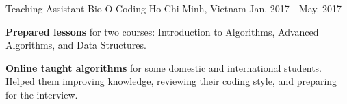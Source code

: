 \begin{cventries}
  \cventry
    {Teaching Assistant} %
    {Bio-O Coding} %
    {Ho Chi Minh, Vietnam} %
    {Jan. 2017 - May. 2017} %
    {
      \begin{cvitems} %
        \item {\textbf{Prepared lessons} for two courses: Introduction to Algorithms, Advanced Algorithms, and Data Structures.}
        \item {\textbf{Online taught algorithms} for some domestic and international students. Helped them improving knowledge, reviewing their coding style, and preparing for the interview.}
      \end{cvitems}
    }

\end{cventries}
